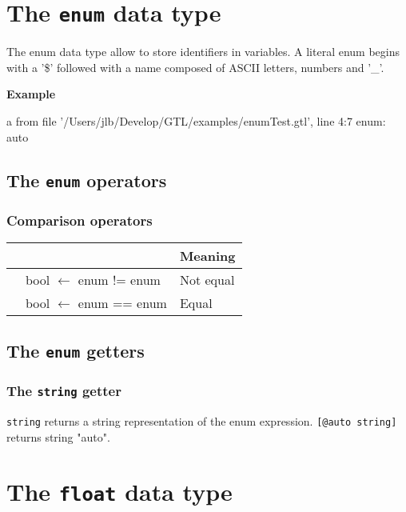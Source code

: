 \documentclass[10pt,openright,twosides,final]{memoir}
\newcommand{\gtltype}[1]{{\small\ttfamily #1}}
\newcommand{\ccst}[1]{{\footnotesize\ttfamily\colorbox{light-blue}{'#1'}}}
\newcommand{\scst}[1]{{\footnotesize\ttfamily\colorbox{light-blue}{"#1"}}}
\newcommand{\gtlinline}[1]{\colorbox{light-blue}{\lstinline[language=gtl]{#1}}}
\newcommand{\example}{\vspace{.75em}\noindent\textbf{Example}\vspace{0em}}
\begin{document}
\section{The \texttt{enum} data type}

The \gtltype{enum} data type allow to store identifiers in variables. A literal enum begins with a \ccst{\$} followed with a name composed of ASCII letters, numbers and \ccst{\_}.

\example
{}
\begin{console}
a from file '/Users/jlb/Develop/GTL/examples/enumTest.gtl', line 4:7
    enum: auto
\end{console}

\subsection{The \texttt{enum} operators}

\subsubsection{Comparison operators}

\begin{longtable}{>{\ttfamily}l|>{\ttfamily}l|l}
{\bfseries Operator}&{\bfseries Expression type}&{\bfseries Meaning}\\
\hline\endhead
 {!=}&
  {bool $\leftarrow$ enum != enum}&
  {Not equal}\\
 {==}&
  {bool $\leftarrow$ enum == enum}&
  {Equal}\\
\end{longtable}

\subsection{The \texttt{enum} getters}

\subsubsection{The \texttt{string} getter}

\gtlinline{string} returns a string representation of the enum expression. \gtlinline{[@auto string]} returns string \scst{auto}.

\section{The \texttt{float} data type}
\end{document}
